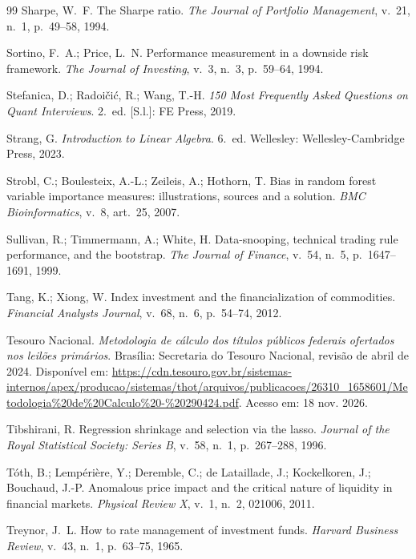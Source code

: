 \begin{thebibliography}{99}
Sharpe, W.~F. The Sharpe ratio. \emph{The Journal of Portfolio Management}, v.~21, n.~1, p.~49--58, 1994.

Sortino, F.~A.; Price, L.~N. Performance measurement in a downside risk framework. \emph{The Journal of Investing}, v.~3, n.~3, p.~59--64, 1994.

Stefanica, D.; Radoičić, R.; Wang, T.-H. \emph{150 Most Frequently Asked Questions on Quant Interviews}. 2.~ed. [S.l.]: FE Press, 2019.

Strang, G. \emph{Introduction to Linear Algebra}. 6.~ed. Wellesley: Wellesley-Cambridge Press, 2023.

Strobl, C.; Boulesteix, A.-L.; Zeileis, A.; Hothorn, T. Bias in random forest variable importance measures: illustrations, sources and a solution. \emph{BMC Bioinformatics}, v.~8, art.~25, 2007.

Sullivan, R.; Timmermann, A.; White, H. Data-snooping, technical trading rule performance, and the bootstrap. \emph{The Journal of Finance}, v.~54, n.~5, p.~1647--1691, 1999.

Tang, K.; Xiong, W. Index investment and the financialization of commodities. \emph{Financial Analysts Journal}, v.~68, n.~6, p.~54--74, 2012.

Tesouro Nacional. \emph{Metodologia de cálculo dos títulos públicos federais ofertados nos leilões primários}. Brasília: Secretaria do Tesouro Nacional, revisão de abril de 2024. Disponível em: \url{https://cdn.tesouro.gov.br/sistemas-internos/apex/producao/sistemas/thot/arquivos/publicacoes/26310_1658601/Metodologia\%20de\%20Calculo\%20-\%20290424.pdf}. Acesso em: 18 nov. 2026.

Tibshirani, R. Regression shrinkage and selection via the lasso. \emph{Journal of the Royal Statistical Society: Series B}, v.~58, n.~1, p.~267--288, 1996.

Tóth, B.; Lempérière, Y.; Deremble, C.; de Lataillade, J.; Kockelkoren, J.; Bouchaud, J.-P. Anomalous price impact and the critical nature of liquidity in financial markets. \emph{Physical Review X}, v.~1, n.~2, 021006, 2011.

Treynor, J.~L. How to rate management of investment funds. \emph{Harvard Business Review}, v.~43, n.~1, p.~63--75, 1965.


\end{thebibliography}
